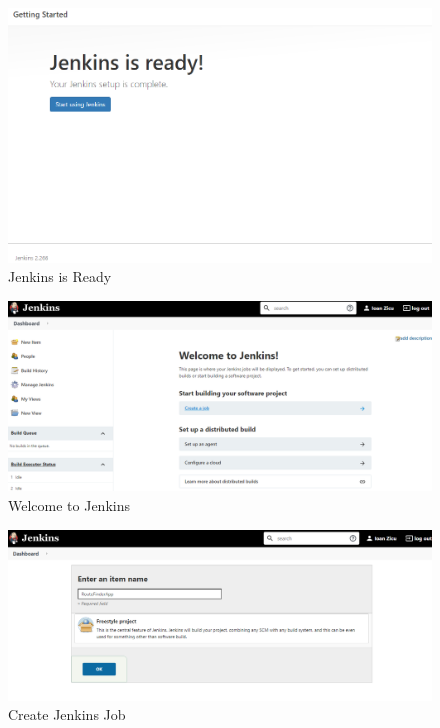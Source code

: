 \documentclass[12pt,a4paper,twoside]{article}
\begin{document}
\begin{figure}[h!]
    \centering
        \includegraphics[width=15cm]{images-aws/28-jenkins-ready.png}
        \caption{Jenkins is Ready}
\end{figure}



\begin{figure}[h!]
    \centering
        \includegraphics[width=15cm]{images-aws/30-jenkins-create-job.png}
        \caption{Welcome to Jenkins}
\end{figure}


\begin{figure}[h!]
    \centering
        \includegraphics[width=15cm]{images-aws/31-jenkins-set-project-name.png}
        \caption{Create Jenkins Job}
\end{figure}
\end{document}
